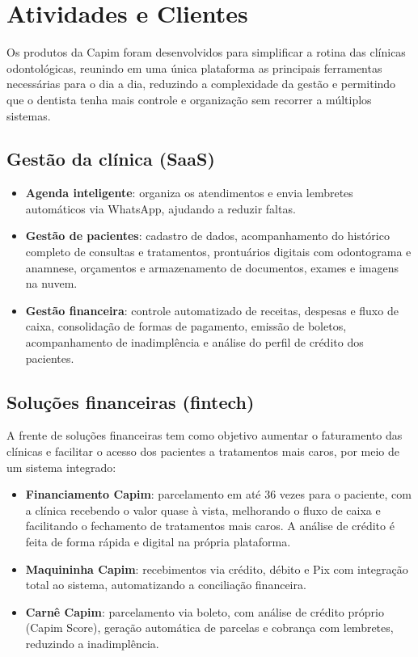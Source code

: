 \section{Atividades e Clientes}

Os produtos da Capim foram desenvolvidos para simplificar a rotina das clínicas odontológicas, reunindo em uma única plataforma as principais ferramentas necessárias para o dia a dia, reduzindo a complexidade da gestão e permitindo que o dentista tenha mais controle e organização sem recorrer a múltiplos sistemas.

\subsection{Gestão da clínica (SaaS)}

\begin{itemize}
  \item \textbf{Agenda inteligente}: organiza os atendimentos e envia lembretes automáticos via WhatsApp, ajudando a reduzir faltas.
  \item \textbf{Gestão de pacientes}: cadastro de dados, acompanhamento do histórico completo de consultas e tratamentos, prontuários digitais com odontograma e anamnese, orçamentos e armazenamento de documentos, exames e imagens na nuvem.
  \item \textbf{Gestão financeira}: controle automatizado de receitas, despesas e fluxo de caixa, consolidação de formas de pagamento, emissão de boletos, acompanhamento de inadimplência e análise do perfil de crédito dos pacientes.
\end{itemize}

\subsection{Soluções financeiras (fintech)}

A frente de soluções financeiras tem como objetivo aumentar o faturamento das clínicas e facilitar o acesso dos pacientes a tratamentos mais caros, por meio de um sistema integrado:

\begin{itemize}
  \item \textbf{Financiamento Capim}: parcelamento em até 36 vezes para o paciente, com a clínica recebendo o valor quase à vista, melhorando o fluxo de caixa e facilitando o fechamento de tratamentos mais caros. A análise de crédito é feita de forma rápida e digital na própria plataforma.
  \item \textbf{Maquininha Capim}: recebimentos via crédito, débito e Pix com integração total ao sistema, automatizando a conciliação financeira.
  \item \textbf{Carnê Capim}: parcelamento via boleto, com análise de crédito próprio (Capim Score), geração automática de parcelas e cobrança com lembretes, reduzindo a inadimplência.
\end{itemize}

